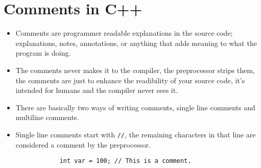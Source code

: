\section{Comments in C++}
\begin{itemize}
    \item Comments are programmer readable explanations in the source code; explanations, notes, annotations, or anything that adds meaning to what the program is doing. 
    \item The comments never makes it to the compiler, the preprocessor strips them, the comments are just to enhance the readibility of your source code, it's intended for humans and the compiler never sees it.
    \item There are basically two ways of writing comments, single line comments and multiline comments.
    \item Single line comments start with \texttt{//}, the remaining characters in that line are considered a comment by the preprocessor.
        \begin{verbatim}
            int var = 100; // This is a comment.
        \end{verbatim}
    

\end{itemize}
